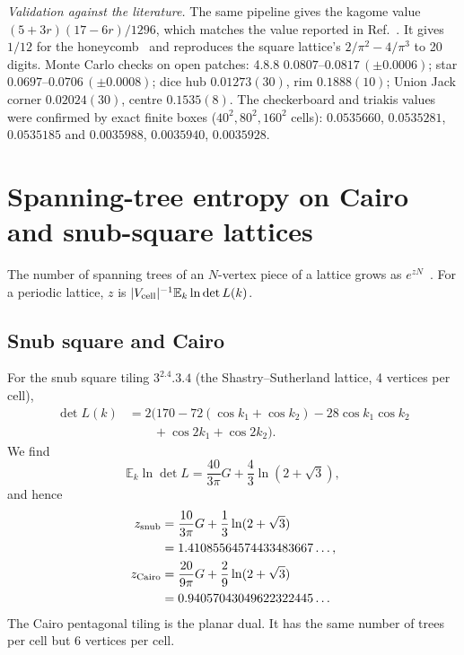 \documentclass[aps,pre,10pt,twocolumn,superscriptaddress,nofootinbib]{revtex4-2}
\newcommand{\E}{\mathbb{E}}
\newcommand{\sq}{\sqrt{3}}
\begin{document}
\emph{Validation against the literature.} The same pipeline gives the kagome value
$(5+3r)(17-6r)/1296$, which matches the value reported in Ref.~\cite{Liu2026}. It gives $1/12$ for the
honeycomb~\cite{AzimiTafreshi2010} and reproduces the square lattice's $2/\pi^2-4/\pi^3$ to 20 digits.
Monte Carlo checks on open patches: 4.8.8 $0.0807$--$0.0817\,(\pm0.0006)$; star
$0.0697$--$0.0706\,(\pm0.0008)$; dice hub $0.01273(30)$, rim $0.1888(10)$; Union Jack corner
$0.02024(30)$, centre $0.1535(8)$. The checkerboard and triakis values were confirmed by exact
finite boxes ($40^2,80^2,160^2$ cells): $0.0535660$, $0.0535281$, $0.0535185$ and
$0.0035988$, $0.0035940$, $0.0035928$.

\section{Spanning-tree entropy on Cairo and snub-square lattices}
\label{sec:entropy}

The number of spanning trees of an $N$-vertex piece of a lattice grows as $e^{zN}$~\cite{Wu1977}. For a
periodic lattice, $z$ is $|V_{\rm cell}|^{-1}\E_k\ln\det L(k)$.

\subsection{Snub square and Cairo}

For the snub square tiling $3^2.4.3.4$ (the Shastry--Sutherland lattice, 4 vertices per cell),
\begin{align}
\det L(k)&=2\bigl(170-72(\cos k_1+\cos k_2)-28\cos k_1\cos k_2\nonumber\\
&\qquad+\cos2k_1+\cos2k_2\bigr).
\end{align}
We find
\begin{equation}
\E_k\ln\det L=\frac{40}{3\pi}G+\frac43\ln(2+\sq),
\end{equation}
and hence
\begin{align}
z_{\rm snub}&=\frac{10}{3\pi}G+\frac13\ln(2+\sq)\nonumber\\
&=1.41085564574433483667\ldots,\\
z_{\rm Cairo}&=\frac{20}{9\pi}G+\frac29\ln(2+\sq)\nonumber\\
&=0.94057043049622322445\ldots
\end{align}
The Cairo pentagonal tiling is the planar dual. It has the same number of trees per cell but 6 vertices per cell.
\end{document}
